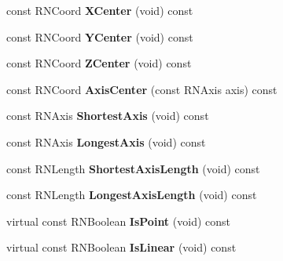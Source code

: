 \begin{DoxyCompactItemize}
\item 
const R\+N\+Coord {\bfseries X\+Center} (void) const \hypertarget{class_r3_box_aec47255955e21b9d0febee73d208761b}{}\label{class_r3_box_aec47255955e21b9d0febee73d208761b}

\item 
const R\+N\+Coord {\bfseries Y\+Center} (void) const \hypertarget{class_r3_box_addaefb57510388295c1b4c4b984cab7a}{}\label{class_r3_box_addaefb57510388295c1b4c4b984cab7a}

\item 
const R\+N\+Coord {\bfseries Z\+Center} (void) const \hypertarget{class_r3_box_a4590f4961f289f37e4754861f66022c5}{}\label{class_r3_box_a4590f4961f289f37e4754861f66022c5}

\item 
const R\+N\+Coord {\bfseries Axis\+Center} (const R\+N\+Axis axis) const \hypertarget{class_r3_box_ac6eee5334ede0ffbb56bd1f042f6966f}{}\label{class_r3_box_ac6eee5334ede0ffbb56bd1f042f6966f}

\item 
const R\+N\+Axis {\bfseries Shortest\+Axis} (void) const \hypertarget{class_r3_box_a88621b7ede139db1109a7bc2bbe09781}{}\label{class_r3_box_a88621b7ede139db1109a7bc2bbe09781}

\item 
const R\+N\+Axis {\bfseries Longest\+Axis} (void) const \hypertarget{class_r3_box_a4db8775ddcc344d14efe36133f3f7ea3}{}\label{class_r3_box_a4db8775ddcc344d14efe36133f3f7ea3}

\item 
const R\+N\+Length {\bfseries Shortest\+Axis\+Length} (void) const \hypertarget{class_r3_box_a97ec98c6727a32305819f79dfda94a9b}{}\label{class_r3_box_a97ec98c6727a32305819f79dfda94a9b}

\item 
const R\+N\+Length {\bfseries Longest\+Axis\+Length} (void) const \hypertarget{class_r3_box_a36109342fc988d494faa8efa56d5b923}{}\label{class_r3_box_a36109342fc988d494faa8efa56d5b923}

\item 
virtual const R\+N\+Boolean {\bfseries Is\+Point} (void) const \hypertarget{class_r3_box_a35efa8055aa0aea477dbbe98c9104ec1}{}\label{class_r3_box_a35efa8055aa0aea477dbbe98c9104ec1}

\item 
virtual const R\+N\+Boolean {\bfseries Is\+Linear} (void) const \hypertarget{class_r3_box_ab4e87edc7b5613e8464f60f0eca085a2}{}\label{class_r3_box_ab4e87edc7b5613e8464f60f0eca085a2}


\end{DoxyCompactItemize}
